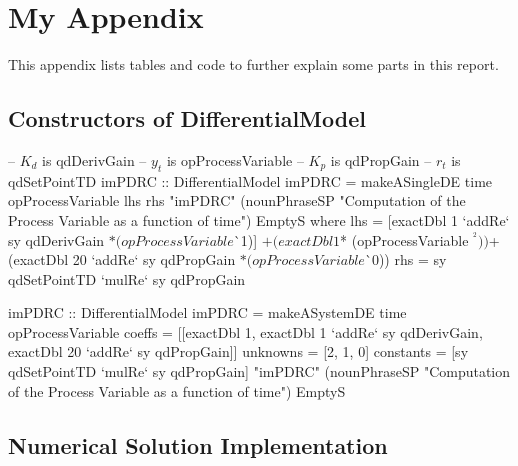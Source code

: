 \chapter{My Appendix}
\label{appendix_a}

This appendix lists tables and code to further explain some parts in this report.

\section{Constructors of DifferentialModel}
\label{const_de}

\begin{haskell1}
-- $K_d$ is qdDerivGain
-- $y_t$ is opProcessVariable
-- $K_p$ is qdPropGain
-- $r_t$ is qdSetPointTD
imPDRC :: DifferentialModel
imPDRC = makeASingleDE
	time
	opProcessVariable
	lhs
	rhs
	"imPDRC"
	(nounPhraseSP "Computation of the Process Variable as a function of time")
	EmptyS
	where 
	lhs = [exactDbl 1 `addRe` sy qdDerivGain $* (opProcessVariable $^^ 1)]
	$+ (exactDbl 1 $* (opProcessVariable $^^ 2))
	$+ (exactDbl 20 `addRe` sy qdPropGain $* (opProcessVariable $^^ 0))
	rhs = sy qdSetPointTD `mulRe` sy qdPropGain
\end{haskell1}

\begin{haskell1}
imPDRC :: DifferentialModel
imPDRC = makeASystemDE
	time
	opProcessVariable
	coeffs = [[exactDbl 1, exactDbl 1 `addRe` sy qdDerivGain, exactDbl 20 `addRe` sy qdPropGain]]
	unknowns = [2, 1, 0]
	constants = [sy qdSetPointTD `mulRe` sy qdPropGain]
	"imPDRC"
	(nounPhraseSP "Computation of the Process Variable as a function of time")
	EmptyS
\end{haskell1}

\pagebreak

\section{Numerical Solution Implementation}
\label{numsol}

    
